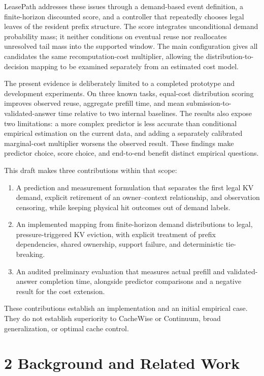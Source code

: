 \documentclass[
  english,
  10pt,
]{article}
\providecommand{\tightlist}{%
  \setlength{\itemsep}{0pt}\setlength{\parskip}{0pt}}
\begin{document}
LeasePath addresses these issues through a demand-based event
definition, a finite-horizon discounted score, and a controller that
repeatedly chooses legal leaves of the resident prefix structure. The
score integrates unconditional demand probability mass; it neither
conditions on eventual reuse nor reallocates unresolved tail mass into
the supported window. The main configuration gives all candidates the
same recomputation-cost multiplier, allowing the
distribution-to-decision mapping to be examined separately from an
estimated cost model.

The present evidence is deliberately limited to a completed prototype
and development experiments. On three known tasks, equal-cost
distribution scoring improves observed reuse, aggregate prefill time,
and mean submission-to-validated-answer time relative to two internal
baselines. The results also expose two limitations: a more complex
predictor is less accurate than conditional empirical estimation on the
current data, and adding a separately calibrated marginal-cost
multiplier worsens the observed result. These findings make predictor
choice, score choice, and end-to-end benefit distinct empirical
questions.

This draft makes three contributions within that scope:

\begin{enumerate}
\def\labelenumi{\arabic{enumi}.}
\tightlist
\item
  A prediction and measurement formulation that separates the first
  legal KV demand, explicit retirement of an owner--context
  relationship, and observation censoring, while keeping physical hit
  outcomes out of demand labels.
\item
  An implemented mapping from finite-horizon demand distributions to
  legal, pressure-triggered KV eviction, with explicit treatment of
  prefix dependencies, shared ownership, support failure, and
  deterministic tie-breaking.
\item
  An audited preliminary evaluation that measures actual prefill and
  validated-answer completion time, alongside predictor comparisons and
  a negative result for the cost extension.
\end{enumerate}

These contributions establish an implementation and an initial empirical
case. They do not establish superiority to CacheWise or Continuum, broad
generalization, or optimal cache control.

\section{2 Background and Related
Work}\label{background-and-related-work}
\end{document}
